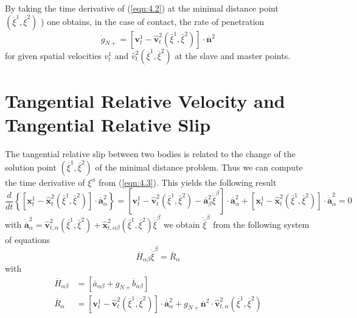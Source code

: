 By taking the time derivative of (\ref{eqn:4.2}) at the minimal distance point $\left(\overline{\xi}^{1}, \overline{\xi}^{2}\right)$ ) one obtains,
in the case of contact, the rate of penetration
\begin{equation}
 \dot{g}_{N+}=\left[\mathbf{v}_{t}^{1}-\hat{\mathbf{v}}_{t}^{2}\left(\bar{\xi}^{1}, \bar{\xi}^{2}\right)\right] \cdot \overline{\mathbf{n}}^{2} 
 \label{eqn:4.4} 
\end{equation}
for given spatial velocities $v_t^1 $ and $\hat{v}_t^2\left(\overline{\xi}^{1},\overline{\xi}^{2}\right)$  at the slave and master points.
\section{Tangential Relative Velocity and Tangential Relative Slip}
The tangential relative slip between two bodies is related to the change of the solution point
$( \overline{\xi}^1 , \overline{\xi}^2)$ of the minimal distance problem. Thus we can compute the time derivative of $\xi^ \alpha$
from (\ref{eqn:4.3}). This yields the following result 
\begin{equation}
 \frac{d}{d t}\left\{\left[\mathbf{x}_{t}^{1}-\hat{\mathbf{x}}_{t}^{2}\left(\bar{\xi}^{1}, \bar{\xi}^{2}\right)\right] \cdot \overline{\mathbf{a}}_{\alpha}^{2}\right\}=\left[\mathbf{v}_{t}^{1}-\hat{\mathbf{v}}_{t}^{2}\left(\bar{\xi}^{1}, \bar{\xi}^{2}\right)-\overline{\mathbf{a}}_{\beta}^{2} \dot{\overline{\xi}}^{\beta} \right] \cdot \overline{\mathbf{a}}_{\alpha}^{2}+\left[\mathbf{x}_{t}^{1}-\hat{\mathbf{x}}_{t}^{2}\left(\bar{\xi}^{1}, \bar{\xi}^{2}\right)\right] \cdot \dot{\overline{\mathbf{a}}}_{\alpha}^{2}=0 
 \label{eqn:4.7} 
\end{equation}
with $\dot{\overline{{\mathbf{a}}}}_{\alpha}^{2}=\hat{\mathbf{v}}_{t, \alpha}^{2}\left(\bar{\xi}^{1}, \bar{\xi}^{2}\right)+\hat{\mathbf{x}}_{t, \alpha \beta}^{2}\left(\bar{\xi}^{1}, \overline{\xi}^{2}\right) \dot{\overline{\xi}}^{\beta} $ we obtain $\dot{\overline{\xi}}^{\beta} $ from the following system of equations
\begin{equation}
    \label{eqn:4.8} 
    \overline{H}_{\alpha \beta } \dot{\overline{\xi}}^{\beta} =\overline{R}_\alpha
\end{equation}
with 
\begin{equation}
 \begin{aligned} \overline{H}_{\alpha \beta} &=\left[\bar{a}_{\alpha \beta}+g_{N+} \overline{b}_{\alpha \beta}\right] \\ \overline{R}_{\alpha} &=\left[\mathbf{v}_{t}^{1}-\hat{\mathbf{v}}_{t}^{2}\left(\overline{\xi}^{1}, \overline{\xi}^{2}\right)\right] \cdot \overline{\mathbf{a}}_{\alpha}^{2}+g_{N+} \overline{\mathbf{n}}^{2} \cdot \hat{\mathbf{v}}_{t, \alpha}^{2}\left(\overline{\xi}^{1}, \overline{\xi}^{2}\right) \end{aligned} 
 \label{eqn:4.9} 
\end{equation}

